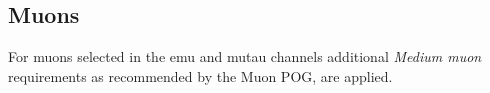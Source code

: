 \subsection{Muons}\label{chapter-HTT_analysis-section-objects-muons}

For muons selected in the emu and mutau channels additional \textit{Medium muon} requirements as recommended by the Muon POG, are applied.\cite{cmsMediumMuon}